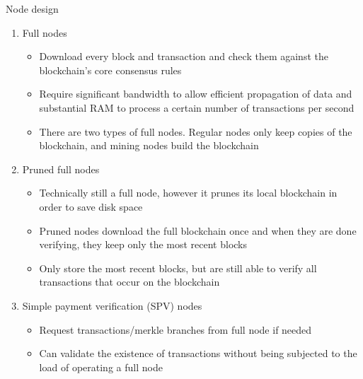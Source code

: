 \documentclass[10pt]{beamer}
\begin{document}
\begin{frame}{Node design}
	\begin{enumerate}
		\item Full nodes
			\begin{itemize}
				\item Download every block and transaction and check them against the blockchain's core consensus rules
				\item Require significant bandwidth to allow efficient propagation of data and substantial RAM to process a certain number of transactions per second
				\item There are two types of full nodes. Regular nodes only keep copies of the blockchain, and mining nodes build the blockchain
			\end{itemize}
		\item Pruned full nodes
			\begin{itemize}
				\item Technically still a full node, however it prunes its local blockchain in order to save disk space
				\item Pruned nodes download the full blockchain once and when they are done verifying, they keep only the most recent blocks
				\item Only store the most recent blocks, but are still able to verify all transactions that occur on the blockchain
			\end{itemize}
		\item Simple payment verification (SPV) nodes
			\begin{itemize}
				\item Request transactions/merkle branches from full node if needed
				\item Can validate the existence of transactions without being subjected to the load of operating a full node
			\end{itemize}
	\end{enumerate}
\end{frame}

\end{document}
